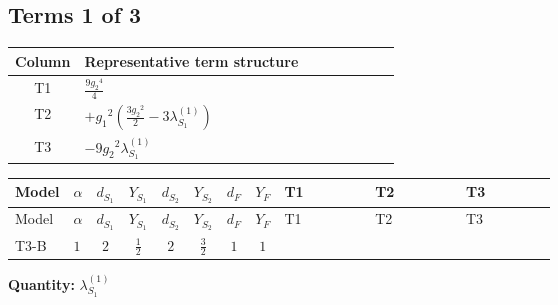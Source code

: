\documentclass[8pt]{article}
\begin{document}
\begin{landscape}
\subsection*{Terms 1 of 3}
\begin{center}
\begin{tabular}{@{}c >{\raggedright\arraybackslash}p{0.82\linewidth}@{}}
\toprule
Column & Representative term structure \\
\midrule
T1 & \(\displaystyle \frac{9 {g_2}^4}{4}\) \\
\midrule
T2 & \(\displaystyle +{g_1}^2 \left(\frac{3 {g_2}^2}{2}-3 {\lambda_{S_1}^{(1)}}\right)\) \\
\midrule
T3 & \(\displaystyle -9 {g_2}^2 {\lambda_{S_1}^{(1)}}\) \\
\midrule
\bottomrule
\end{tabular}
\end{center}
\smallskip
\tiny
\begin{longtable}{@{}llcccccc >{\raggedright\arraybackslash}p{0.21\linewidth} >{\raggedright\arraybackslash}p{0.21\linewidth} >{\raggedright\arraybackslash}p{0.21\linewidth}@{}}
\toprule
Model & $\alpha$ & $d_{S_1}$ & $Y_{S_1}$ & $d_{S_2}$ & $Y_{S_2}$ & $d_F$ & $Y_F$ & T1 & T2 & T3 \\
\midrule
\endfirsthead
\toprule
Model & $\alpha$ & $d_{S_1}$ & $Y_{S_1}$ & $d_{S_2}$ & $Y_{S_2}$ & $d_F$ & $Y_F$ & T1 & T2 & T3 \\
\midrule
\endhead
T3-B & $1$ & $2$ & $\frac{1}{2}$ & $2$ & $\frac{3}{2}$ & $1$ & $1$ & \scriptsize\adjustbox{max width=\linewidth}{$\begin{gathered} \frac{9 {g_2}^4}{4}\end{gathered}$} & \scriptsize\adjustbox{max width=\linewidth}{$\begin{gathered} +{g_1}^2 \left(\frac{3 {g_2}^2}{2}-3 {\lambda_{S_1}^{(1)}}\right)\end{gathered}$} & \scriptsize\adjustbox{max width=\linewidth}{$\begin{gathered} -9 {g_2}^2 {\lambda_{S_1}^{(1)}}\end{gathered}$} \\
\midrule
\bottomrule
\end{longtable}
\clearpage
\noindent\textbf{Quantity: }$\lambda_{S_1}^{(1)}$\par\smallskip

\end{landscape}
\end{document}
